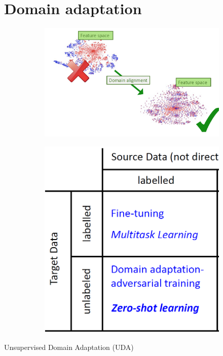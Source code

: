 \documentclass{article}
\theoremstyle{plain}%
\theoremstyle{definition}
\theoremstyle{remark}
\begin{document}
\section{Domain adaptation}
\begin{figure}[H]
    \centering
    \begin{subfigure}{.5\textwidth}
        \centering
        \includegraphics*[width=.95\textwidth]{figs/UDA.png}
    \end{subfigure}%
    \begin{subfigure}{.5\textwidth}
        \centering
        \includegraphics*[width=.7\textwidth]{figs/transfert_learning_overview.png}
    \end{subfigure}
\end{figure}
Unsupervised Domain Adaptation (UDA)
\end{document}

